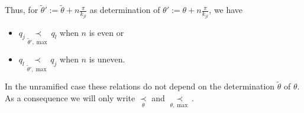 \begin{defn}
\begin{itemize}
\begin{s-rem}
        Thus, for $\tilde\theta':=\tilde\theta+n\frac{\pi}{k_{jl}}$ as
        determination of $\theta':=\theta+n\frac{\pi}{k_{jl}}$, we have
        \begin{itemize}
          \item $q_j \underset{\tilde\theta',\max}{\prec} q_l$ when $n$ is even
            or
          \item $q_l \underset{\tilde\theta',\max}{\prec} q_j$ when $n$ is
            uneven.
        \end{itemize}
      \end{s-rem}
  \end{itemize}
  \begin{s-rem}
    In the unramified case these relations do not depend on the determination
    $\tilde\theta$ of $\theta$. As a consequence we will only write
    $\underset{\theta}{\prec}$ and $\underset{\theta,\max}{\prec}$.
  \end{s-rem}
\end{defn}

